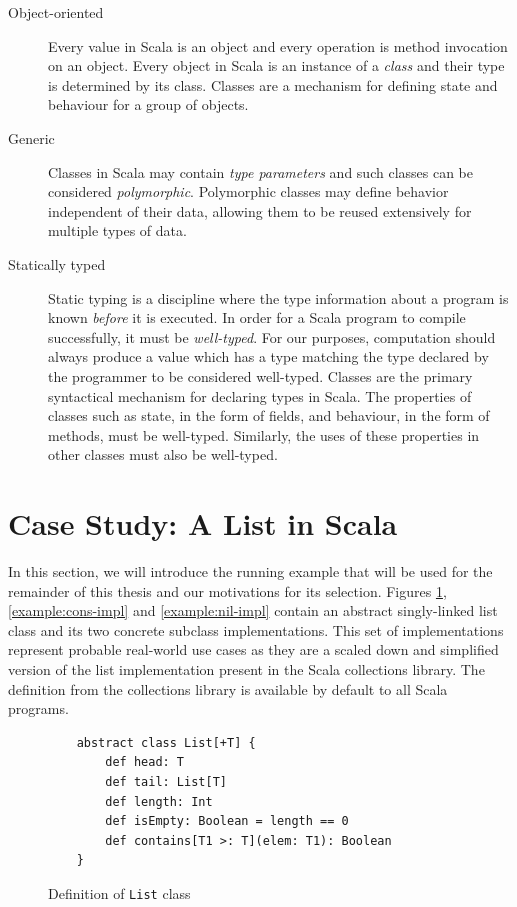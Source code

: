 \begin{description}
	\item[Object-oriented] 
	Every value in Scala is an object and every operation is method invocation on an object. 
	Every object in Scala is an instance of a \textit{class} and their type is determined by its class.
	Classes\cite{simula:classes} are a mechanism for defining state and behaviour for a group of objects.	
	
	\item[Generic] 
	Classes in Scala may contain \textit{type parameters} and such classes can be considered \textit{polymorphic}\cite{strachey:fundamental-concepts}.
	Polymorphic classes may define behavior independent of their data, allowing them to be reused extensively for multiple types of data.
	
	\item[Statically typed] 
	Static typing is a discipline where the type information about a program is known \textit{before} it is executed.
	In order for a Scala program to compile successfully, it must be \textit{well-typed}.
	For our purposes, computation should always produce a value which has a type matching the type declared by the programmer to be considered well-typed.
	Classes are the primary syntactical mechanism for declaring types in Scala. 
	The properties of classes such as state, in the form of fields, and behaviour, in the form of methods, must be well-typed.
	Similarly, the uses of these properties in other classes must also be well-typed. 
\end{description}

\section{Case Study: A List in Scala}

In this section, we will introduce the running example that will be used for the remainder of this thesis and our motivations for its selection.
Figures \ref{example:list-def}, \ref{example:cons-impl} and \ref{example:nil-impl} contain an abstract singly-linked list class and its two concrete subclass implementations. 
This set of  implementations represent probable real-world use cases as they are a scaled down and simplified version of the list implementation present in the Scala collections library.
The  definition from the collections library is available by default to all Scala programs.

\begin{figure}[!htb]
	\begin{verbatim}
	abstract class List[+T] {
		def head: T
		def tail: List[T]
		def length: Int
		def isEmpty: Boolean = length == 0
		def contains[T1 >: T](elem: T1): Boolean
	}
	\end{verbatim}
	\caption{Definition of \texttt{List} class}
	\label{example:list-def}
\end{figure}

